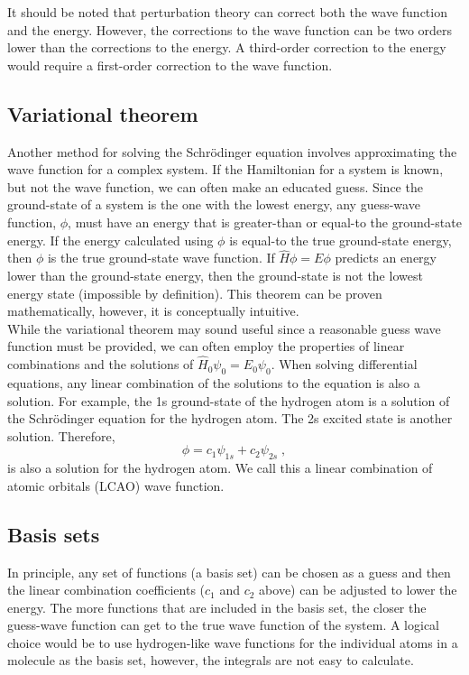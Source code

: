 \documentclass[12pt]{report}
\begin{document}
It should be noted that perturbation theory can correct both the wave function
and the energy. However, the corrections to the wave function can be two orders
lower than the corrections to the energy. A third-order correction to the
energy would require a first-order correction to the wave function.

\subsection{Variational theorem}

Another method for solving the Schr\"{o}dinger equation involves approximating
the wave function for a complex system. If the Hamiltonian for a system is
known, but not the wave function, we can often make an educated guess. Since
the ground-state of a system is the one with the lowest energy, any
guess-wave function, $\phi$, must have an energy that is greater-than or
equal-to the ground-state energy. If the energy calculated using $\phi$ is
equal-to the true ground-state energy, then $\phi$ is the true ground-state
wave function. If $\hat H\phi=E\phi$ predicts an energy lower than the
ground-state energy, then the ground-state is not the lowest energy state
(impossible by definition). This theorem can be proven mathematically,
however, it is conceptually intuitive. \\

While the variational theorem may sound useful since a reasonable guess
wave function must be provided, we can often employ the properties of linear
combinations and the solutions of $\hat H_0\psi_0=E_0\psi_0$. When solving
differential equations, any linear combination of the solutions to the
equation is also a solution. For example, the 1s ground-state of the hydrogen
atom is a solution of the Schr\"{o}dinger equation for the hydrogen atom. The
2s excited state is another solution. Therefore,
\begin{equation}
 \phi = c_1\psi_{1s}+c_2\psi_{2s} \; ,
\end{equation}
is also a solution for the hydrogen atom. We call this a linear combination of
atomic orbitals (LCAO) wave function.

\subsection{Basis sets}

In principle, any set of functions (a basis set) can be chosen as a guess and
then the linear combination coefficients ($c_1$ and $c_2$ above) can be
adjusted to lower the energy. The more functions that are included in the
basis set, the closer the guess-wave function can get to the true wave
function of the system. A logical choice would be to use hydrogen-like wave
functions for the individual atoms in a molecule as the basis set, however,
the integrals are not easy to calculate. \\
\end{document}
